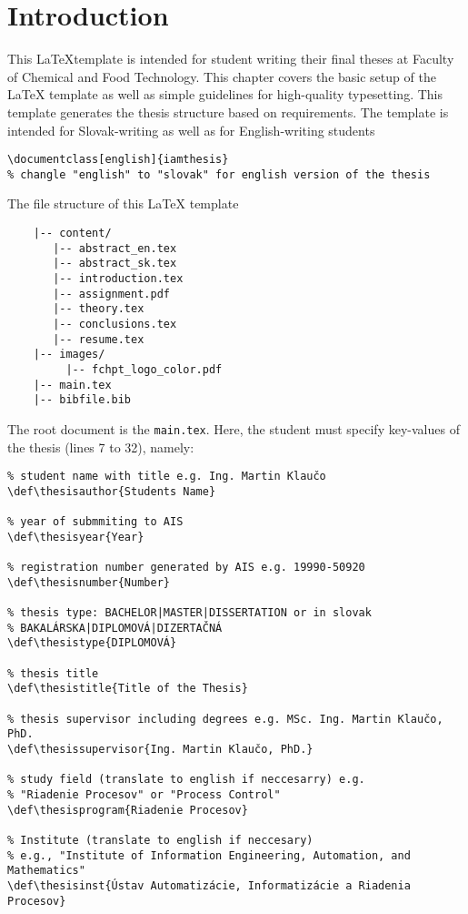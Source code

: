 \chapter{Introduction}
\label{ch:intro}

This \LaTeX template is intended for student writing their final theses at 
Faculty of Chemical and Food Technology. This chapter covers the basic setup of 
the LaTeX template as well as simple guidelines for high-quality typesetting. 
This template generates the thesis structure based on requirements. The 
template is intended for Slovak-writing as well as for English-writing students
\begin{verbatim}
\documentclass[english]{iamthesis}
% changle "english" to "slovak" for english version of the thesis
\end{verbatim}

The file structure of this LaTeX template
\begin{verbatim}
	|-- content/
	   |-- abstract_en.tex
	   |-- abstract_sk.tex
	   |-- introduction.tex	   
	   |-- assignment.pdf
	   |-- theory.tex
	   |-- conclusions.tex
	   |-- resume.tex
	|-- images/
		 |-- fchpt_logo_color.pdf
	|-- main.tex
	|-- bibfile.bib
\end{verbatim}

The root document is the \texttt{main.tex}. Here, the student must specify 
key-values of the thesis (lines 7 to 32), namely:
\begin{verbatim}
% student name with title e.g. Ing. Martin Klaučo
\def\thesisauthor{Students Name} 

% year of submmiting to AIS
\def\thesisyear{Year}

% registration number generated by AIS e.g. 19990-50920
\def\thesisnumber{Number} 

% thesis type: BACHELOR|MASTER|DISSERTATION or in slovak 
% BAKALÁRSKA|DIPLOMOVÁ|DIZERTAČNÁ
\def\thesistype{DIPLOMOVÁ}

% thesis title
\def\thesistitle{Title of the Thesis}

% thesis supervisor including degrees e.g. MSc. Ing. Martin Klaučo, PhD.
\def\thesissupervisor{Ing. Martin Klaučo, PhD.}

% study field (translate to english if neccesarry) e.g. 
% "Riadenie Procesov" or "Process Control"
\def\thesisprogram{Riadenie Procesov}

% Institute (translate to english if neccesary)
% e.g., "Institute of Information Engineering, Automation, and Mathematics"
\def\thesisinst{Ústav Automatizácie, Informatizácie a Riadenia Procesov}
\end{verbatim}

